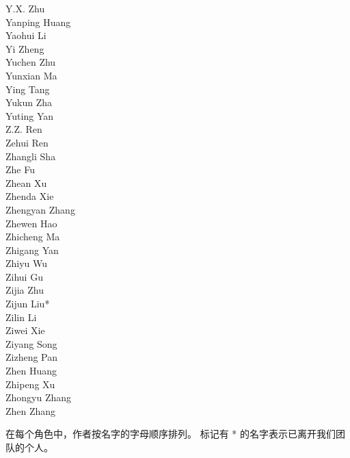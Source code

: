 \documentclass[11pt, a4paper, logo, copyright, nonumbering]{deepseek}
\begin{document}
\begin{multicols}{2}
\color{damaiblue} Y.X. Zhu \\
\color{damaiblue} Yanping Huang \\
\color{damaiblue} Yaohui Li \\
\color{damaiblue} Yi Zheng \\
\color{damaiblue} Yuchen Zhu \\
\color{damaiblue} Yunxian Ma \\
\color{damaiblue} Ying Tang \\
\color{damaiblue} Yukun Zha \\
\color{damaiblue} Yuting Yan \\
\color{damaiblue} Z.Z. Ren \\
\color{damaiblue} Zehui Ren \\
\color{damaiblue} Zhangli Sha \\
\color{damaiblue} Zhe Fu \\
\color{damaiblue} Zhean Xu \\
\color{damaiblue} Zhenda Xie \\
\color{damaiblue} Zhengyan Zhang \\
\color{damaiblue} Zhewen Hao \\
\color{damaiblue} Zhicheng Ma \\
\color{damaiblue} Zhigang Yan \\
\color{damaiblue} Zhiyu Wu \\
\color{damaiblue} Zihui Gu \\
\color{damaiblue} Zijia Zhu \\
\color{damaiblue} Zijun Liu* \\
\color{damaiblue} Zilin Li \\
\color{damaiblue} Ziwei Xie \\
\color{damaiblue} Ziyang Song \\
\color{damaiblue} Zizheng Pan \\
\color{damaiblue} Zhen Huang \\
\color{damaiblue} Zhipeng Xu \\
\color{damaiblue} Zhongyu Zhang \\
\color{damaiblue} Zhen Zhang \\

\end{multicols}

在每个角色中，作者按名字的字母顺序排列。
标记有 * 的名字表示已离开我们团队的个人。

\setcounter{figure}{0}
\makeatletter
\renewcommand{\thefigure}{A\@arabic\c@figure}
\makeatother

\setcounter{table}{0}
\makeatletter
\renewcommand{\thetable}{A\@arabic\c@table}
\makeatother
\end{document}
